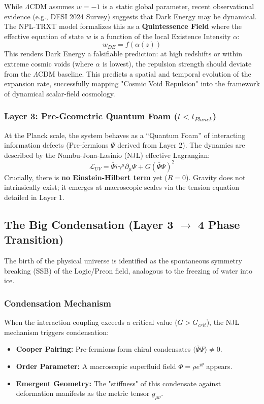 \documentclass[a4paper,12pt]{article}
\begin{document}
While $\Lambda$CDM assumes $w = -1$ is a static global parameter, recent observational evidence (e.g., DESI 2024 Survey) suggests that Dark Energy may be dynamical. The NPL-TRXT model formalizes this as a \textbf{Quintessence Field} where the effective equation of state $w$ is a function of the local Existence Intensity $\alpha$:
\begin{equation}
    w_{DE} = f(\alpha(z))
\end{equation}
This renders Dark Energy a falsifiable prediction: at high redshifts or within extreme cosmic voids (where $\alpha$ is lowest), the repulsion strength should deviate from the $\Lambda$CDM baseline. This predicts a spatial and temporal evolution of the expansion rate, successfully mapping "Cosmic Void Repulsion" into the framework of dynamical scalar-field cosmology.

\subsubsection{Layer 3: Pre-Geometric Quantum Foam ($t < t_{Planck}$)}
At the Planck scale, the system behaves as a ``Quantum Foam'' of interacting information defects (Pre-fermions $\Psi$ derived from Layer 2). The dynamics are described by the Nambu-Jona-Lasinio (NJL) effective Lagrangian:
\begin{equation}
    \mathcal{L}_{UV} = \bar{\Psi} i \gamma^\mu \partial_\mu \Psi + G (\bar{\Psi} \Psi)^2
\end{equation}
Crucially, there is \textbf{no Einstein-Hilbert term} yet ($R=0$). Gravity does not intrinsically exist; it emerges at macroscopic scales via the tension equation detailed in Layer 1.

\subsection{The Big Condensation (Layer 3 $\to$ 4 Phase Transition)}

The birth of the physical universe is identified as the spontaneous symmetry breaking (SSB) of the Logic/Preon field, analogous to the freezing of water into ice.

\subsubsection{Condensation Mechanism}
When the interaction coupling exceeds a critical value ($G > G_{crit}$), the NJL mechanism triggers condensation:
\begin{itemize}
    \item \textbf{Cooper Pairing:} Pre-fermions form chiral condensates $\langle \bar{\Psi}\Psi \rangle \neq 0$.
    \item \textbf{Order Parameter:} A macroscopic superfluid field $\Phi = \rho e^{i\theta}$ appears.
    \item \textbf{Emergent Geometry:} The "stiffness" of this condensate against deformation manifests as the metric tensor $g_{\mu\nu}$.
\end{itemize}
\end{document}
